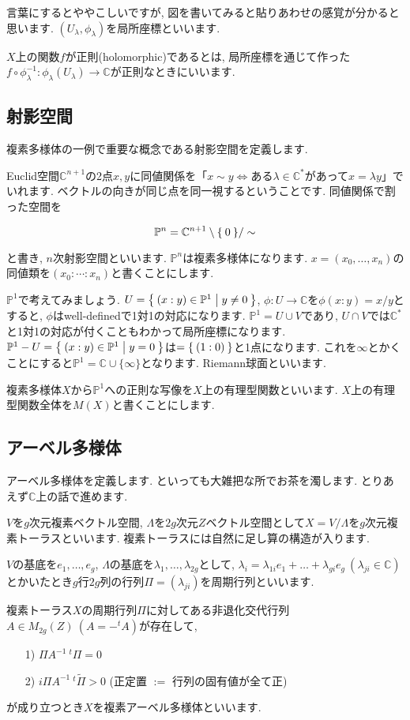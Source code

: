 \documentclass{jsarticle}
\newcommand{\CC}{\mathbb{C}}
\newcommand{\PP}{\mathbb{P}}
\theoremstyle{definition}
\numberwithin{theorem}{section}
\begin{document}
言葉にするとややこしいですが, 図を書いてみると貼りあわせの感覚が分かると思います. $(U_\lambda, \phi_\lambda)$を局所座標といいます.

$X$上の関数$f$が正則(holomorphic)であるとは, 局所座標を通じて作った$f\circ\phi_\lambda^{-1}: \phi_\lambda(U_\lambda) \rightarrow \CC$が正則なときにいいます. 

\subsection{射影空間}
複素多様体の一例で重要な概念である射影空間を定義します.

Euclid空間$\CC^{n+1}$の2点$x, y$に同値関係を「$x\sim y\Leftrightarrow $ある$\lambda \in \CC^*$があって$x = \lambda y$」でいれます. ベクトルの向きが同じ点を同一視するということです. 同値関係で割った空間を

\[
\PP^n = \CC^{n+1}\setminus{\Set{0}} / \sim
\]

と書き, $n$次射影空間といいます. $\PP^n$は複素多様体になります. $x = (x_0, \ldots, x_n)$の同値類を$(x_0 : \cdots : x_n)$と書くことにします.

$\PP^1$で考えてみましょう. $U = \Set{(x:y) \in \PP^1 | y \neq 0}$, $\phi: U \rightarrow \CC$を$\phi(x:y) = x / y$とすると, $\phi$はwell-definedで1対1の対応になります. $\PP^1 = U\cup V$であり, $U\cap V$では$\CC^*$と1対1の対応が付くこともわかって局所座標になります. $\PP^1 - U = \Set{(x:y) \in \PP^1 | y = 0}$は$ = \Set{(1:0)}$と1点になります. これを$\infty$とかくことにすると$\PP^1 = \CC \cup \{\infty\}$となります. Riemann球面といいます. 

複素多様体$X$から$\PP^1$への正則な写像を$X$上の有理型関数といいます. $X$上の有理型関数全体を$M(X)$と書くことにします.
\subsection{アーベル多様体}
アーベル多様体を定義します. といっても大雑把な所でお茶を濁します. とりあえず$\CC$上の話で進めます.

$V$を$g$次元複素ベクトル空間, $\Lambda$を$2g$次元$Z$ベクトル空間として$X = V/\Lambda$を$g$次元複素トーラスといいます. 複素トーラスには自然に足し算の構造が入ります. 

$V$の基底を$e_1, \ldots, e_g$, $\Lambda$の基底を$\lambda_1, \ldots, \lambda_{2g}$として, $\lambda_i = \lambda_{1i}e_1 + \ldots + \lambda_{gi}e_g\ (\lambda_{ji} \in \CC)$とかいたとき$g$行$2g$列の行列$\Pi = (\lambda_{ji})$を周期行列といいます.

複素トーラス$X$の周期行列$\Pi$に対してある非退化交代行列$A \in M_{2g}(Z)\ (A = -^tA)$が存在して, 
\begin{itemize}
\item[1)] $\Pi A^{-1}{\ }^t\Pi = 0$
\item[2)] $i \Pi A^{-1}{\ }^t\tilde\Pi > 0$ (正定置 $:=$ 行列の固有値が全て正)
\end{itemize}
が成り立つとき$X$を複素アーベル多様体といいます.
\end{document}

